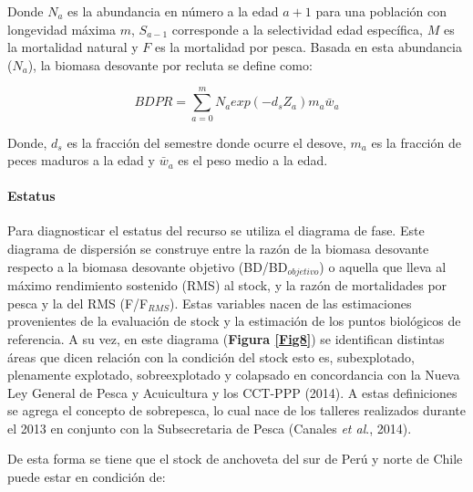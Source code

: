 \documentclass[letter,11pt]{article}
\begin{document}
Donde $N_a$ es la abundancia en n\'umero a la edad $a+1$ para una
poblaci\'on con longevidad m\'axima $m$, $S_{a-1}$ corresponde a la
selectividad edad espec\'ifica, $M$ es la mortalidad natural y $F$ es
la mortalidad por pesca. Basada en esta abundancia ($N_a$), la biomasa
desovante por recluta se define como:

\begin{equation}
BDPR=\sum_{a=0}^{m} N_a exp(-d_sZ_a)m_a\bar{w}_a
\end{equation}

Donde, $d_s$ es la fracci\'on del semestre donde ocurre el desove,
$m_a$ es la fracci\'on de peces maduros a la edad y $\bar{w}_a$ es el
peso medio a la edad.


\paragraph{Estatus}

\quad

Para diagnosticar el estatus del recurso se utiliza el diagrama de fase.
Este diagrama de dispersi\'on se construye entre la raz\'on de la biomasa
desovante respecto a la biomasa desovante objetivo
(BD/BD$_{objetivo}$) o aquella que lleva al m\'aximo rendimiento
sostenido (RMS) al stock, y la raz\'on de mortalidades por pesca y la del
RMS (F/F$_{RMS}$). Estas variables nacen de las estimaciones
provenientes de la evaluaci\'on de stock y la estimaci\'on de los puntos
biol\'ogicos de referencia. A su vez, en este diagrama
(\textbf{Figura \ref{Fig8}}) se identifican distintas \'areas que dicen
relaci\'on con la condici\'on del stock esto es, subexplotado, plenamente
explotado, sobreexplotado y colapsado en concordancia con la Nueva Ley
General de Pesca y Acuicultura y los CCT-PPP (2014). A estas
definiciones se agrega el concepto de sobrepesca, lo cual nace de los
talleres realizados durante el 2013 en conjunto con la Subsecretaria de
Pesca (Canales \textit{et al}., 2014).

De esta forma se tiene que el stock de anchoveta del sur de Per\'u y norte
de Chile puede estar en condici\'on de:
\end{document}
